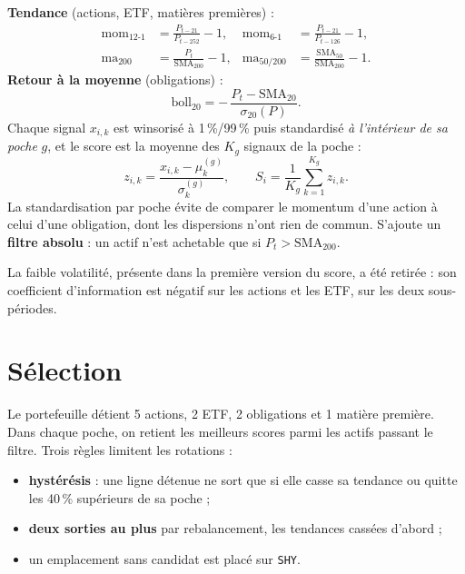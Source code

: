 \documentclass[10pt,twocolumn,a4paper]{extarticle}
\newcommand{\code}[1]{\texttt{\small #1}}
\begin{document}
\textbf{Tendance} (actions, ETF, matières premières) :
\begin{align*}
\text{mom}_{12\text{-}1} &= \frac{P_{t-21}}{P_{t-252}}-1, &
\text{mom}_{6\text{-}1} &= \frac{P_{t-21}}{P_{t-126}}-1,\\
\text{ma}_{200} &= \frac{P_t}{\mathrm{SMA}_{200}}-1, &
\text{ma}_{50/200} &= \frac{\mathrm{SMA}_{50}}{\mathrm{SMA}_{200}}-1.
\end{align*}
\textbf{Retour à la moyenne} (obligations) :
\[
\text{boll}_{20} = -\,\frac{P_t-\mathrm{SMA}_{20}}{\sigma_{20}(P)}.
\]
Chaque signal $x_{i,k}$ est winsorisé à 1\,\%/99\,\% puis standardisé \emph{à l'intérieur de sa poche} $g$, et le score est la moyenne des $K_g$ signaux de la poche :
\[
z_{i,k}=\frac{x_{i,k}-\mu^{(g)}_k}{\sigma^{(g)}_k},\qquad S_i=\frac{1}{K_g}\sum_{k=1}^{K_g} z_{i,k}.
\]
La standardisation par poche évite de comparer le momentum d'une action à celui d'une obligation, dont les dispersions n'ont rien de commun. S'ajoute un \textbf{filtre absolu} : un actif n'est achetable que si $P_t>\mathrm{SMA}_{200}$.

La faible volatilité, présente dans la première version du score, a été retirée : son coefficient d'information est négatif sur les actions et les ETF, sur les deux sous-périodes.

\section{Sélection}
Le portefeuille détient 5 actions, 2 ETF, 2 obligations et 1 matière première. Dans chaque poche, on retient les meilleurs scores parmi les actifs passant le filtre. Trois règles limitent les rotations :
\begin{itemize}
\item \textbf{hystérésis} : une ligne détenue ne sort que si elle casse sa tendance ou quitte les 40\,\% supérieurs de sa poche ;
\item \textbf{deux sorties au plus} par rebalancement, les tendances cassées d'abord ;
\item un emplacement sans candidat est placé sur \code{SHY}.
\end{itemize}
\end{document}
